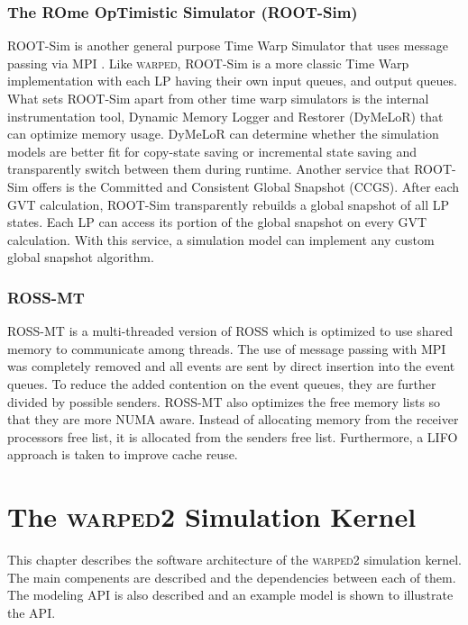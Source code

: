 \documentclass[11pt]{book}
\begin{document}
\subsection{The ROme OpTimistic Simulator (ROOT-Sim)}

ROOT-Sim is another general purpose Time Warp Simulator that uses message passing via MPI
\cite{pellegrini-11}. Like \textsc{warped}, ROOT-Sim is a more classic Time Warp
implementation with each LP having their own input queues, and output queues. What sets
ROOT-Sim apart from other time warp simulators is the internal instrumentation tool, Dynamic
Memory Logger and Restorer (DyMeLoR) that can optimize memory usage. DyMeLoR can determine
whether the simulation models are better fit for copy-state saving or incremental state
saving and transparently switch between them during runtime. Another service that ROOT-Sim
offers is the Committed and Consistent Global Snapshot (CCGS). After each GVT calculation,
ROOT-Sim transparently rebuilds a global snapshot of all LP states. Each LP can access its
portion of the global snapshot on every GVT calculation. With this service, a simulation
model can implement any custom global snapshot algorithm.

\subsection{ROSS-MT}

ROSS-MT\cite{jagtap-12} is a multi-threaded version of ROSS which is optimized to use shared
memory to communicate among threads. The use of message passing with MPI was completely
removed and all events are sent by direct insertion into the event queues. To reduce the
added contention on the event queues, they are further divided by possible senders. ROSS-MT
also optimizes the free memory lists so that they are more NUMA aware. Instead of allocating
memory from the receiver processors free list, it is allocated from the senders free list.
Furthermore, a LIFO approach is taken to improve cache reuse.



\chapter{The \textsc{warped2} Simulation Kernel}\label{warped2_overview}

This chapter describes the software architecture of the \textsc{warped2} simulation kernel.
The main compenents are described and the dependencies between each of them. The modeling API
is also described and an example model is shown to illustrate the API.
\end{document}
